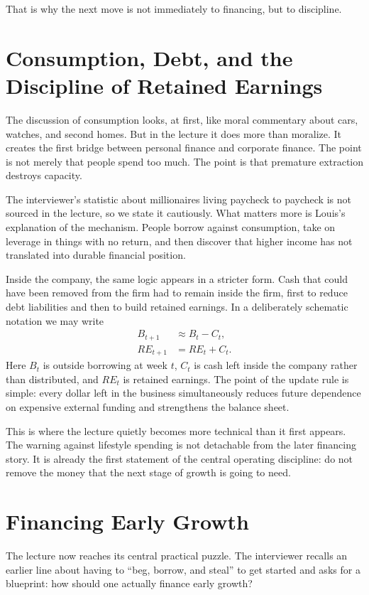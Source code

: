 That is why the next move is not immediately to financing, but to discipline.

\section{Consumption, Debt, and the Discipline of Retained Earnings}

The discussion of consumption looks, at first, like moral commentary about cars, watches, and second homes. But in the lecture it does more than moralize. It creates the first bridge between personal finance and corporate finance. The point is not merely that people spend too much. The point is that premature extraction destroys capacity.

The interviewer's statistic about millionaires living paycheck to paycheck is not sourced in the lecture, so we state it cautiously. What matters more is Louis's explanation of the mechanism. People borrow against consumption, take on leverage in things with no return, and then discover that higher income has not translated into durable financial position.

Inside the company, the same logic appears in a stricter form. Cash that could have been removed from the firm had to remain inside the firm, first to reduce debt liabilities and then to build retained earnings. In a deliberately schematic notation we may write
\begin{align}
B_{t+1} &\approx B_t - C_t,\\
RE_{t+1} &= RE_t + C_t.
\end{align}
Here \(B_t\) is outside borrowing at week \(t\), \(C_t\) is cash left inside the company rather than distributed, and \(RE_t\) is retained earnings. The point of the update rule is simple: every dollar left in the business simultaneously reduces future dependence on expensive external funding and strengthens the balance sheet.

This is where the lecture quietly becomes more technical than it first appears. The warning against lifestyle spending is not detachable from the later financing story. It is already the first statement of the central operating discipline: do not remove the money that the next stage of growth is going to need.

\section{Financing Early Growth}

The lecture now reaches its central practical puzzle. The interviewer recalls an earlier line about having to ``beg, borrow, and steal'' to get started and asks for a blueprint: how should one actually finance early growth?

